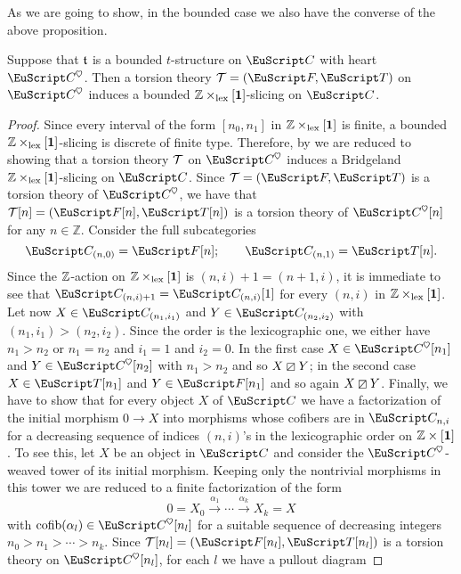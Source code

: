 As we are going to show, in the bounded case we also have the converse of the above proposition.

\begin{lemma}\label{verso.il.tilting}
Suppose that $\mathfrak{t}$ is a bounded $t$-structure on $\C$ with heart $\C^\heart$. Then a torsion theory $\T=(\cate{F},\cate{T})$ on $\C^\heart$ induces a bounded $\mathbb{Z} \times_{\mathrm{lex}} [\mathbf{1}]$-slicing on $\C$. 
\end{lemma} 
\begin{proof}
Since every interval of the form $[n_0,n_1]$ in $\mathbb{Z} \times_{\mathrm{lex}} [\mathbf{1}]$ is finite, a bounded $\mathbb{Z} \times_{\mathrm{lex}} [\mathbf{1}]$-slicing is discrete of finite type. Therefore, by \aprop{} we are reduced to showing that a torsion theory $\mathcal{T}$ on $\C^\heart$ induces a Bridgeland $\mathbb{Z} \times_{\mathrm{lex}} [\mathbf{1}]$-slicing on $\C$. Since $\T=(\cate{F}, \cate{T})$ is a torsion theory of $\C^\heart$, we have that  $\T[n]=(\cate{F}[n], \cate{T}[n])$ is a torsion theory of $\C^\heart[n]$ for any $n\in \mathbb{Z}$.
Consider the full subcategories
\[
\C_{(n,0)}=\cate{F}[n];\qquad 
\C_{(n,1)}=\cate{T}[n].
\]
Since the $\mathbb{Z}$-action on $\mathbb{Z}\times_{\mathrm{lex}}[\mathbf{1}]$ is $(n,i)+1=(n+1,i)$, it is immediate to see that $\C_{(n,i)+1}=\C_{(n,i)}[1]$ for every $(n,i)$ in $\mathbb{Z}\times_{\mathrm{lex}}[\mathbf{1}]$. Let now $X\in \C_{(n_1,i_1)}$ and $Y\in \C_{(n_2,i_2)}$ with $(n_1,i_1)>(n_2,i_2)$. Since the order is the lexicographic one, we either have $n_1>n_2$ or $n_1=n_2$ and $i_1=1$ and $i_2=0$. In the first case $X\in \C^\heart[n_1]$ and $Y\in \C^\heart[n_2]$ with $n_1>n_2$ and so $X\boxslash Y$; in the second case $X\in \cate{T}[n_1]$ and $Y\in \cate{F}[n_1]$ and so again $X\boxslash Y$. Finally, {\color{green!40!black} we have to show that for every object $X$ of $\C$ we have a factorization of the initial morphism $0\to X$ into morphisms whose cofibers are in $\C_{n,i}$ for a decreasing sequence of indices $(n,i)$'s in the lexicographic order on $\mathbb{Z} \times [\mathbf{1}]$. To see this, let} $X$ be an object in $\C$ and consider the $\C^\heart$-weaved tower of its initial morphism. Keeping only the nontrivial morphisms in this tower we are reduced to a finite factorization of the form
$$0=X_0 \xrightarrow{\alpha_1} \cdots \xrightarrow{\alpha_k} X_k=X$$ 
with $\cofib(\alpha_l)\in \C^\heart[n_l]$ for a suitable sequence of decreasing integers $n_0>n_1>\cdots > n_k$. Since $\T[n_l]=(\cate{F}[n_l], \cate{T}[n_l])$ is a torsion theory on $\C^\heart[n_l]$,  {\color{green!40!black}for each $l$} we have a pullout diagram

\end{proof}
